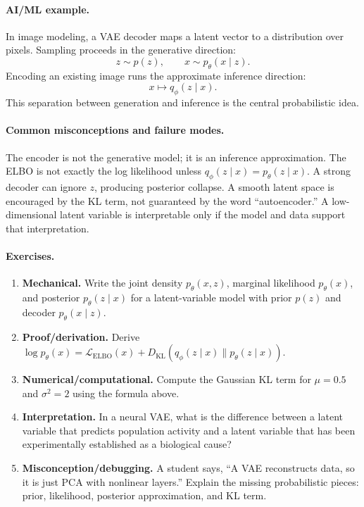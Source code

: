 \paragraph{AI/ML example.}
In image modeling, a VAE decoder maps a latent vector to a distribution over pixels. Sampling proceeds in the generative direction:
\[
z\sim p(z),\qquad x\sim p_\theta(x\mid z).
\]
Encoding an existing image runs the approximate inference direction:
\[
x\mapsto q_\phi(z\mid x).
\]
This separation between generation and inference is the central probabilistic idea.

\paragraph{Common misconceptions and failure modes.}
The encoder is not the generative model; it is an inference approximation. The ELBO is not exactly the log likelihood unless \(q_\phi(z\mid x)=p_\theta(z\mid x)\). A strong decoder can ignore \(z\), producing posterior collapse. A smooth latent space is encouraged by the KL term, not guaranteed by the word ``autoencoder.'' A low-dimensional latent variable is interpretable only if the model and data support that interpretation.

\paragraph{Exercises.}
\begin{enumerate}[label=\textbf{41.1.\arabic*.}, leftmargin=*]
\item \textbf{Mechanical.} Write the joint density \(p_\theta(x,z)\), marginal likelihood \(p_\theta(x)\), and posterior \(p_\theta(z\mid x)\) for a latent-variable model with prior \(p(z)\) and decoder \(p_\theta(x\mid z)\).
\item \textbf{Proof/derivation.} Derive \(\log p_\theta(x)=\mathcal L_{\mathrm{ELBO}}(x)+D_{\mathrm{KL}}(q_\phi(z\mid x)\|p_\theta(z\mid x))\).
\item \textbf{Numerical/computational.} Compute the Gaussian KL term for \(\mu=0.5\) and \(\sigma^2=2\) using the formula above.
\item \textbf{Interpretation.} In a neural VAE, what is the difference between a latent variable that predicts population activity and a latent variable that has been experimentally established as a biological cause?
\item \textbf{Misconception/debugging.} A student says, ``A VAE reconstructs data, so it is just PCA with nonlinear layers.'' Explain the missing probabilistic pieces: prior, likelihood, posterior approximation, and KL term.
\end{enumerate}

